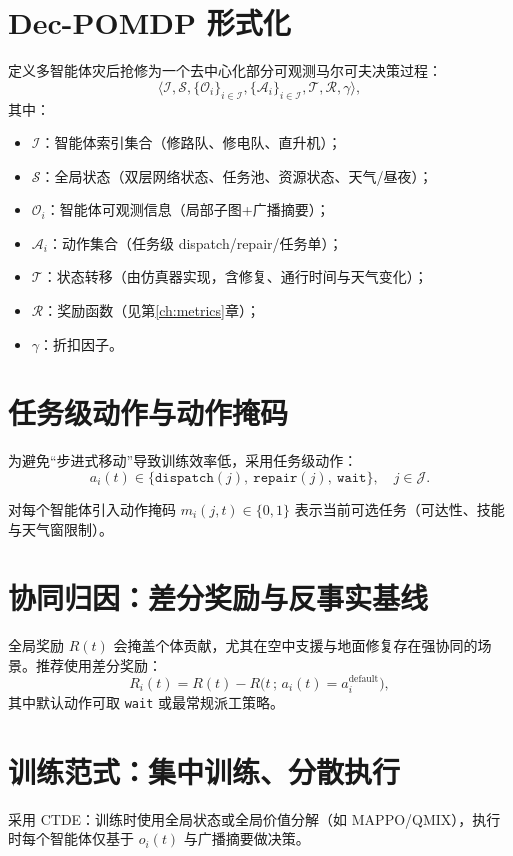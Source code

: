 \documentclass[UTF8,zihao=-4,a4paper,fontset=fandol]{ctexrep}
\begin{document}
\section{Dec-POMDP 形式化}
定义多智能体灾后抢修为一个去中心化部分可观测马尔可夫决策过程：
\begin{equation}
\langle \mathcal{I}, \mathcal{S}, \{\mathcal{O}_i\}_{i\in\mathcal{I}}, \{\mathcal{A}_i\}_{i\in\mathcal{I}}, \mathcal{T}, \mathcal{R}, \gamma \rangle,
\end{equation}
其中：
\begin{itemize}[leftmargin=2em]
  \item $\mathcal{I}$：智能体索引集合（修路队、修电队、直升机）；
  \item $\mathcal{S}$：全局状态（双层网络状态、任务池、资源状态、天气/昼夜）；
  \item $\mathcal{O}_i$：智能体可观测信息（局部子图+广播摘要）；
  \item $\mathcal{A}_i$：动作集合（任务级 dispatch/repair/任务单）；
  \item $\mathcal{T}$：状态转移（由仿真器实现，含修复、通行时间与天气变化）；
  \item $\mathcal{R}$：奖励函数（见第\ref{ch:metrics}章）；
  \item $\gamma$：折扣因子。
\end{itemize}

\section{任务级动作与动作掩码}
为避免“步进式移动”导致训练效率低，采用任务级动作：
\begin{equation}
  a_i(t)\in\{\texttt{dispatch}(j),\ \texttt{repair}(j),\ \texttt{wait}\},\quad j\in\mathcal{J}.
\end{equation}

对每个智能体引入动作掩码 $m_i(j,t)\in\{0,1\}$ 表示当前可选任务（可达性、技能与天气窗限制）。

\section{协同归因：差分奖励与反事实基线}
全局奖励 $R(t)$ 会掩盖个体贡献，尤其在空中支援与地面修复存在强协同的场景。推荐使用差分奖励：
\begin{equation}
  R_i(t)=R(t)-R\big(t\,;\,a_i(t)=a_i^{\text{default}}\big),
\end{equation}
其中默认动作可取 \texttt{wait} 或最常规派工策略。

\section{训练范式：集中训练、分散执行}
采用 CTDE：训练时使用全局状态或全局价值分解（如 MAPPO/QMIX），执行时每个智能体仅基于 $o_i(t)$ 与广播摘要做决策。
\end{document}
